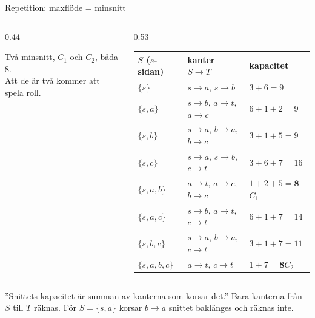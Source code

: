 \documentclass[11pt,aspectratio=169,xcolor=table,t]{beamer}
\begin{document}
\begin{frame}{Repetition: maxflöde = minsnitt}
\begin{columns}[T]
\begin{column}{0.44\textwidth}
\centering
{}\par\smallskip
\footnotesize Två minsnitt, $C_1$ och $C_2$, båda 8.\\ Att de är två kommer att spela roll.
\end{column}
\begin{column}{0.53\textwidth}
\footnotesize
\renewcommand{\arraystretch}{1.1}
\begin{tabular}{@{}lll@{}}
\toprule
$S$ ($s$-sidan) & kanter $S\to T$ & kapacitet\\
\midrule
$\{s\}$ & $s{\to}a$, $s{\to}b$ & $3+6=9$\\
$\{s,a\}$ & $s{\to}b$, $a{\to}t$, $a{\to}c$ & $6+1+2=9$\\
$\{s,b\}$ & $s{\to}a$, $b{\to}a$, $b{\to}c$ & $3+1+5=9$\\
$\{s,c\}$ & $s{\to}a$, $s{\to}b$, $c{\to}t$ & $3+6+7=16$\\
\rowcolor{plum!12} $\{s,a,b\}$ & $a{\to}t$, $a{\to}c$, $b{\to}c$ & $1+2+5=\mathbf{8}$\enspace$C_1$\\
$\{s,a,c\}$ & $s{\to}b$, $a{\to}t$, $c{\to}t$ & $6+1+7=14$\\
$\{s,b,c\}$ & $s{\to}a$, $b{\to}a$, $c{\to}t$ & $3+1+7=11$\\
\rowcolor{plum!12} $\{s,a,b,c\}$ & $a{\to}t$, $c{\to}t$ & $1+7=\mathbf{8}$\enspace$C_2$\\
\bottomrule
\end{tabular}
\end{column}
\end{columns}
\vfill
\begin{missbox}
”Snittets kapacitet är summan av kanterna som korsar det.” Bara kanterna från $S$ till $T$
räknas. För $S=\{s,a\}$ korsar $b\to a$ snittet baklänges och räknas inte.
\end{missbox}
\end{frame}
\end{document}
